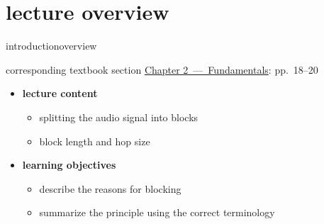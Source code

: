 




\subtitle{Module 2.4: Fundamentals~---~Blocking}


	

    \section[overview]{lecture overview}
        \begin{frame}{introduction}{overview}
            \begin{block}{corresponding textbook section}
                    \href{http://ieeexplore.ieee.org/xpl/articleDetails.jsp?tp=&arnumber=6331119&}{Chapter 2~---~Fundamentals}: pp.~18--20
            \end{block}

            \begin{itemize}
                \item   \textbf{lecture content}
                    \begin{itemize}
                        \item   splitting the audio signal into blocks
                        \item   block length and hop size
                    \end{itemize}
                \bigskip
                \item<2->   \textbf{learning objectives}
                    \begin{itemize}
                        \item   describe the reasons for blocking
                        \item   summarize the principle using the correct terminology
                    \end{itemize}
            \end{itemize}
        \end{frame}

